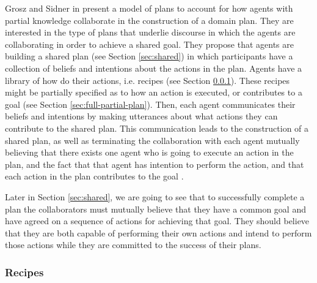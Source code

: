 \documentclass[11pt]{article}
\begin{document}
Grosz and Sidner in \cite{grosz:plans-discourse} present a model of plans to
account for how agents with partial knowledge collaborate in the construction of
a domain plan. They are interested in the type of plans that underlie discourse
in which the agents are collaborating in order to achieve a shared goal. They
propose that agents are building a shared plan (see Section \ref{sec:shared}) in
which participants have a collection of beliefs and intentions about the actions
in the plan. Agents have a library of how do their actions, i.e. recipes (see
Section \ref{sec:recipe}). These recipes might be partially specified as to how
an action is executed, or contributes to a goal (see Section
\ref{sec:full-partial-plan}). Then, each agent communicates their beliefs and
intentions by making utterances about what actions they can contribute to the
shared plan. This communication leads to the construction of a shared plan, as
well as terminating the collaboration with each agent mutually believing that
there exists one agent who is going to execute an action in the plan, and the
fact that that agent has intention to perform the action, and that each action
in the plan contributes to the goal \cite{grosz:plans-discourse}
\cite{lochbaum:plan-models}.

Later in Section \ref{sec:shared}, we are going to see that to successfully
complete a plan the collaborators must mutually believe that they have a common
goal and have agreed on a sequence of actions for achieving that goal. They
should believe that they are both capable of performing their own actions and
intend to perform those actions while they are committed to the success of their
plans.

\subsubsection{Recipes}
\label{sec:recipe}
\end{document}
